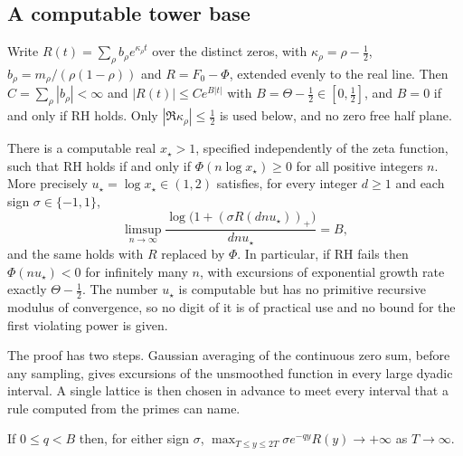 \subsection{A computable tower base}
Write $R(t)=\sum_\rho b_\rho e^{\kappa_\rho t}$ over the distinct zeros, with $\kappa_\rho=\rho-\tfrac12$, $b_\rho=m_\rho/(\rho(1-\rho))$ and $R=F_0-\Phi$, extended evenly to the real line. Then $C=\sum_\rho|b_\rho|<\infty$ and $|R(t)|\le Ce^{B|t|}$ with $B=\Theta-\tfrac12\in[0,\tfrac12]$, and $B=0$ if and only if RH holds. Only $|\Re\kappa_\rho|\le\tfrac12$ is used below, and no zero free half plane.
\begin{theorem}\label{st:thm:base}
There is a computable real $x_\star>1$, specified independently of the zeta function, such that RH holds if and only if $\Phi(n\log x_\star)\ge0$ for all positive integers $n$. More precisely $u_\star=\log x_\star\in(1,2)$ satisfies, for every integer $d\ge1$ and each sign $\sigma\in\{-1,1\}$,
\[
\limsup_{n\to\infty}\frac{\log\big(1+(\sigma R(dnu_\star))_+\big)}{dnu_\star}=B,
\]
and the same holds with $R$ replaced by $\Phi$. In particular, if RH fails then $\Phi(nu_\star)<0$ for infinitely many $n$, with excursions of exponential growth rate exactly $\Theta-\tfrac12$. The number $u_\star$ is computable but has no primitive recursive modulus of convergence, so no digit of it is of practical use and no bound for the first violating power is given.
\end{theorem}
The proof has two steps. Gaussian averaging of the continuous zero sum, before any sampling, gives excursions of the unsmoothed function in every large dyadic interval. A single lattice is then chosen in advance to meet every interval that a rule computed from the primes can name.
\begin{lemma}\label{st:lem:excursion}
If $0\le q<B$ then, for either sign $\sigma$, $\max_{T\le y\le2T}\sigma e^{-qy}R(y)\to+\infty$ as $T\to\infty$.
\end{lemma}
